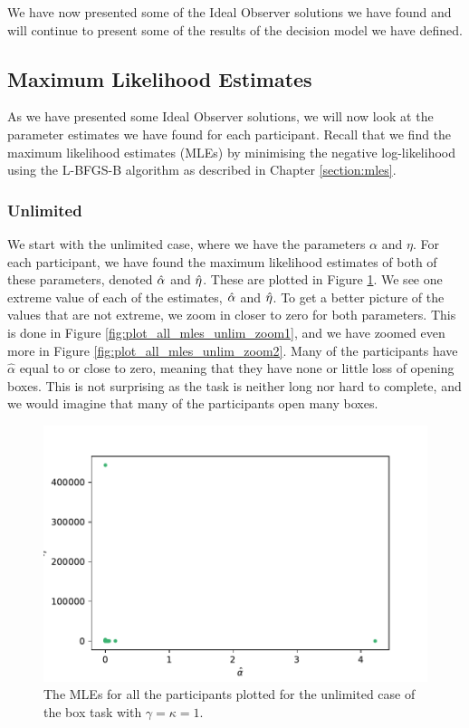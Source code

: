 We have now presented some of the Ideal Observer solutions we have found and will continue to present some of the results of the decision model we have defined. 




\subsection{Maximum Likelihood Estimates}
\label{chapter:mles}
As we have presented some Ideal Observer solutions, we will now look at the parameter estimates we have found for each participant. Recall that we find the maximum likelihood estimates (MLEs) by minimising the negative log-likelihood using the L-BFGS-B algorithm as described in Chapter \ref{section:mles}.


\subsubsection{Unlimited}
We start with the unlimited case, where we have the parameters $\alpha$ and $\eta$. For each participant, we have found the maximum likelihood estimates of both of these parameters, denoted $\hat{\alpha}$ and $\hat{\eta}$. These are plotted in Figure \ref{fig:plot_all_mles_unlim_zoom0}. We see one extreme value of each of the estimates, $\hat{\alpha}$ and $\hat{\eta}$. To get a better picture of the values that are not extreme, we zoom in closer to zero for both parameters. This is done in Figure \ref{fig:plot_all_mles_unlim_zoom1}, and we have zoomed even more in Figure \ref{fig:plot_all_mles_unlim_zoom2}. Many of the participants have $\hat{\alpha}$ equal to or close to zero, meaning that they have none or little loss of opening boxes. This is not surprising as the task is neither long nor hard to complete, and we would imagine that many of the participants open many boxes. 



\begin{figure}
    \centering
    \includegraphics[scale=0.6]{pictures/plotted_mles_unlim_gk1.pdf}
    \caption[MLEs of $\alpha$ and $\eta$, unlimited with $\gamma=\kappa=1$.]{The MLEs for all the participants plotted for the unlimited case of the box task with $\gamma=\kappa=1$.}
    \label{fig:plot_all_mles_unlim_zoom0}
\end{figure}

